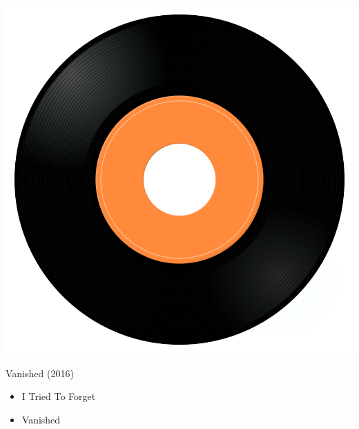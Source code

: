\begin{minipage}[t]{0.25\textwidth}
\captionsetup{type=figure}
\includegraphics[width=\textwidth]{Images/cover.png}
\caption*{Vanished (2016)}
\end{minipage}
\begin{minipage}[t]{0.25\textwidth}\vspace{0pt}
\begin{itemize}[nosep,leftmargin=1em,labelwidth=*,align=left]
	\setlength{\itemsep}{0pt}
	\item I Tried To Forget
	\item Vanished
\end{itemize}
\end{minipage}
